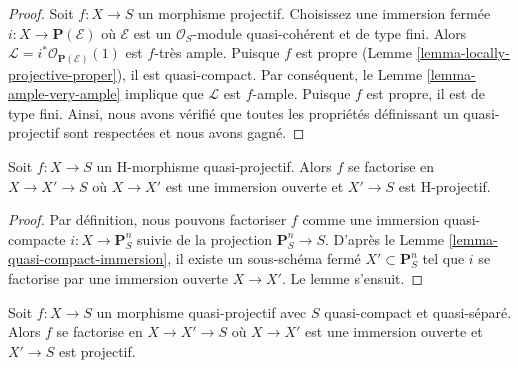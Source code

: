 \begin{proof}
Soit $f : X \to S$ un morphisme projectif. Choisissez une immersion fermée
$i : X \to \mathbf{P}(\mathcal{E})$ où $\mathcal{E}$ est un $\mathcal{O}_S$-module quasi-cohérent et
de type fini. Alors $\mathcal{L} = i^*\mathcal{O}_{\mathbf{P}(\mathcal{E})}(1)$ est
$f$-très ample. Puisque $f$ est propre (Lemme \ref{lemma-locally-projective-proper}), il
est quasi-compact. Par conséquent, le Lemme \ref{lemma-ample-very-ample} implique
que $\mathcal{L}$ est $f$-ample. Puisque $f$ est propre,
il est de type fini. Ainsi, nous avons vérifié que toutes les propriétés
définissant un quasi-projectif sont respectées et nous
avons gagné.
\end{proof}

\begin{lemma}
\label{lemma-H-quasi-projective-open-H-projective}
Soit $f : X \to S$ un H-morphisme quasi-projectif. Alors
$f$ se factorise en $X \to X' \to S$ où $X \to X'$ est une immersion
ouverte et $X' \to S$ est H-projectif.
\end{lemma}

\begin{proof}
Par définition, nous pouvons factoriser $f$ comme
une immersion quasi-compacte $i : X \to \mathbf{P}^n_S$ suivie de la projection $\mathbf{P}^n_S \to S$.
D'après le Lemme \ref{lemma-quasi-compact-immersion}, il existe un sous-schéma fermé
$X' \subset \mathbf{P}^n_S$ tel que $i$ se factorise par une immersion
ouverte $X \to X'$. Le lemme s'ensuit.
\end{proof}

\begin{lemma}
\label{lemma-quasi-projective-open-projective}
Soit $f : X \to S$ un morphisme quasi-projectif avec $S$ quasi-compact
et quasi-séparé. Alors $f$ se factorise en $X \to X' \to S$ où $X \to X'$ est
une immersion ouverte et $X' \to S$ est projectif.
\end{lemma}

